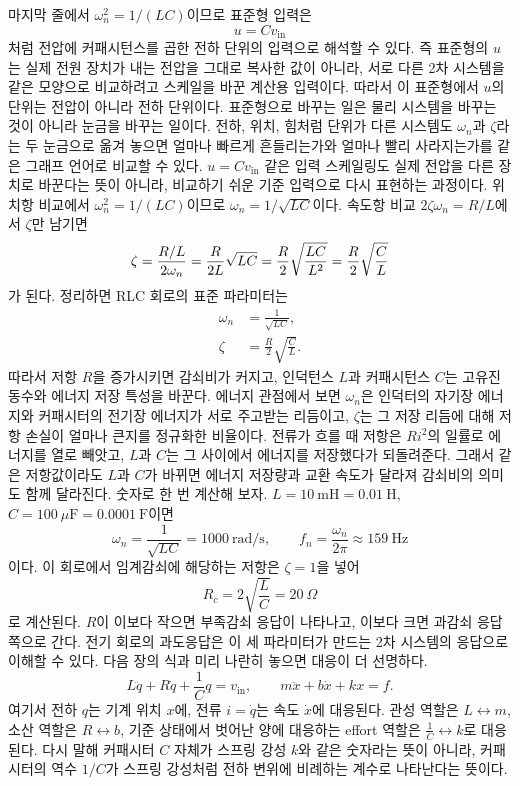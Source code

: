 마지막 줄에서 $\omega_n^2=1/(LC)$이므로 표준형 입력은
\begin{equation}
  u=Cv_{\mathrm{in}}
\end{equation}
처럼 전압에 커패시턴스를 곱한 전하 단위의 입력으로 해석할 수 있다.
즉 표준형의 $u$는 실제 전원 장치가 내는 전압을 그대로 복사한 값이 아니라, 서로 다른 2차 시스템을 같은 모양으로 비교하려고 스케일을 바꾼 계산용 입력이다.
따라서 이 표준형에서 $u$의 단위는 전압이 아니라 전하 단위이다.
표준형으로 바꾸는 일은 물리 시스템을 바꾸는 것이 아니라 눈금을 바꾸는 일이다.
전하, 위치, 힘처럼 단위가 다른 시스템도 $\omega_n$과 $\zeta$라는 두 눈금으로 옮겨 놓으면 얼마나 빠르게 흔들리는가와 얼마나 빨리 사라지는가를 같은 그래프 언어로 비교할 수 있다.
$u=Cv_{\mathrm{in}}$ 같은 입력 스케일링도 실제 전압을 다른 장치로 바꾼다는 뜻이 아니라, 비교하기 쉬운 기준 입력으로 다시 표현하는 과정이다.
위치항 비교에서 $\omega_n^2=1/(LC)$이므로 $\omega_n=1/\sqrt{LC}$이다.
속도항 비교 $2\zeta\omega_n=R/L$에서 $\zeta$만 남기면
\[
  \zeta
  =
  \frac{R/L}{2\omega_n}
  =
  \frac{R}{2L}\sqrt{LC}
  =
  \frac{R}{2}\sqrt{\frac{LC}{L^2}}
  =
  \frac{R}{2}\sqrt{\frac{C}{L}}
\vmark{rlc-zeta-isolation}%
\]
가 된다.
정리하면 RLC 회로의 표준 파라미터는
\begin{align}
  \omega_n &= \frac{1}{\sqrt{LC}}, \\
  \zeta &= \frac{R}{2} \sqrt{\frac{C}{L}}.
\end{align}
따라서 저항 $R$을 증가시키면 감쇠비가 커지고, 인덕턴스 $L$과 커패시턴스 $C$는 고유진동수와 에너지 저장 특성을 바꾼다.
에너지 관점에서 보면 $\omega_n$은 인덕터의 자기장 에너지와 커패시터의 전기장 에너지가 서로 주고받는 리듬이고, $\zeta$는 그 저장 리듬에 대해 저항 손실이 얼마나 큰지를 정규화한 비율이다.
전류가 흐를 때 저항은 $Ri^2$의 일률로 에너지를 열로 빼앗고, $L$과 $C$는 그 사이에서 에너지를 저장했다가 되돌려준다.
그래서 같은 저항값이라도 $L$과 $C$가 바뀌면 에너지 저장량과 교환 속도가 달라져 감쇠비의 의미도 함께 달라진다.
숫자로 한 번 계산해 보자.
$L=10~\mathrm{mH}=0.01~\mathrm{H}$, $C=100~\mu\mathrm{F}=0.0001~\mathrm{F}$이면
\begin{equation}
  \omega_n=\frac{1}{\sqrt{LC}}=1000~\mathrm{rad/s},
  \qquad
  f_n=\frac{\omega_n}{2\pi}\approx159~\mathrm{Hz}
\end{equation}
이다.
이 회로에서 임계감쇠에 해당하는 저항은 $\zeta=1$을 넣어
\begin{equation}
  R_c = 2\sqrt{\frac{L}{C}} = 20~\Omega
\end{equation}
로 계산된다.
$R$이 이보다 작으면 부족감쇠 응답이 나타나고, 이보다 크면 과감쇠 응답 쪽으로 간다.
전기 회로의 과도응답은 이 세 파라미터가 만드는 2차 시스템의 응답으로 이해할 수 있다.
다음 장의 식과 미리 나란히 놓으면 대응이 더 선명하다.
\begin{equation}
  L\ddot{q}+R\dot{q}+\frac{1}{C}q=v_{\mathrm{in}},
  \qquad
  m\ddot{x}+b\dot{x}+kx=f.
\end{equation}
여기서 전하 $q$는 기계 위치 $x$에, 전류 $i=\dot{q}$는 속도 $\dot{x}$에 대응된다.
관성 역할은 $L \leftrightarrow m$, 소산 역할은 $R \leftrightarrow b$, 기준 상태에서 벗어난 양에 대응하는 effort 역할은 $\frac{1}{C} \leftrightarrow k$로 대응된다.
다시 말해 커패시터 $C$ 자체가 스프링 강성 $k$와 같은 숫자라는 뜻이 아니라, 커패시터의 역수 $1/C$가 스프링 강성처럼 전하 변위에 비례하는 계수로 나타난다는 뜻이다.

